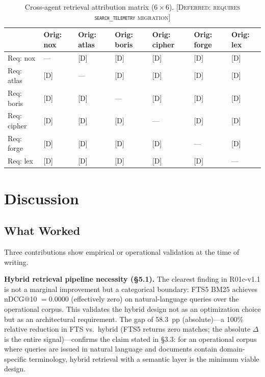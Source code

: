 \begin{table}[t]
  \caption{Cross-agent retrieval attribution matrix ($6{\times}6$). \textsc{[Deferred:
    requires \texttt{search\_telemetry} migration]}}
  \label{tab:attribution}
  \centering
  {\footnotesize
  \setlength{\tabcolsep}{3pt}
\begin{tabular}{lllllll}
    \toprule
    & Orig: nox & Orig: atlas & Orig: boris & Orig: cipher & Orig: forge & Orig: lex \\
    \midrule
    Req: nox    & ---    & [D] & [D] & [D] & [D] & [D] \\
    Req: atlas  & [D] & ---    & [D] & [D] & [D] & [D] \\
    Req: boris  & [D] & [D] & ---    & [D] & [D] & [D] \\
    Req: cipher & [D] & [D] & [D] & ---    & [D] & [D] \\
    Req: forge  & [D] & [D] & [D] & [D] & ---    & [D] \\
    Req: lex    & [D] & [D] & [D] & [D] & [D] & ---    \\
    \bottomrule
  \end{tabular}}
\end{table}

\section{Discussion}

\subsection{What Worked}

Three contributions show empirical or operational validation at the time of writing.

\textbf{Hybrid retrieval pipeline necessity (\S5.1).} The clearest finding in R01c-v1.1 is not
a marginal improvement but a categorical boundary: FTS5 BM25 achieves nDCG@10 $= 0.0000$
(effectively zero) on natural-language queries over the operational corpus. This validates
the hybrid design not as an optimization choice but as an architectural requirement. The
gap of 58.3~pp (absolute)---a 100\% relative reduction in FTS vs.\ hybrid (FTS5 returns zero matches; the absolute $\Delta$ is the entire signal)---confirms the
claim stated in \S3.3: for an operational corpus where queries are issued in natural
language and documents contain domain-specific terminology, hybrid retrieval with a semantic
layer is the minimum viable design.

